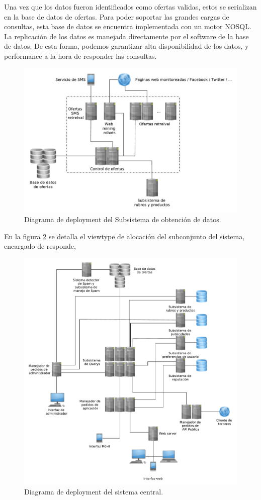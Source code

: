 Una vez que los datos fueron identificados como ofertas validas, estos se serializan en la base de datos de ofertas. Para poder soportar las grandes cargas de consultas, esta base de datos se encuentra implementada con un motor NOSQL. La replicación de los datos es manejada directamente por el software de la base de datos. De esta forma, podemos garantizar alta disponibilidad de los datos, y performance a la hora de responder las consultas.

\begin{figure}[H]
	\centering
	\includegraphics[width=\textwidth]{graficos/deploy/deploy_obtencion_datos.pdf}
	\caption{Diagrama de deployment del \textsf{Subsistema de obtención de datos}.}
	\label{fig:obtencion_datos}
\end{figure}

En la figura \ref{fig:deploy_query} se detalla el viewtype de alocación del subconjunto del sistema, encargado de responde, 


\begin{figure}[H]
	\centering
	\includegraphics[width=\textwidth]{graficos/deploy/deploy_cont.pdf}
	\caption{Diagrama de deployment del sistema central.}
	\label{fig:deploy_query}
\end{figure}



